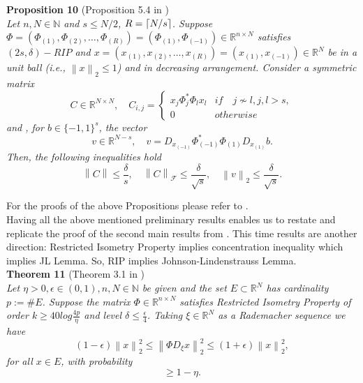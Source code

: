 \documentclass[twoside,11pt]{article}
\newcommand\norm[1]{\left\lVert#1\right\rVert}
\newcommand*\by{{\times}}
\DeclarePairedDelimiter\ceil{\lceil}{\rceil}
\begin{document}
\noindent
{\bf Proposition 10} (Proposition 5.4 in \citep{Khramer}) \\
{\it Let $n, N \in \mathbb{N}$ and $s \leq N/2$, $R = \ceil{N/s}$. Suppose $\Phi = (\Phi_{(1)}, \Phi_{(2)}, \dots, \Phi_{(R)}) = (\Phi_{(1)}, \Phi_{(-1)}) \in \mathbb{R}^{n \by N}$ satisfies $(2s, \delta)-RIP$ and $x = (x_{(1)}, x_{(2)}, \dots, x_{(R)}) = (x_{(1)}, x_{(-1)}) \in \mathbb{R}^N$ be in a unit ball (i.e., $\norm{x}_2 \leq 1$) and in decreasing arrangement. Consider a symmetric matrix
$$
 C \in \mathbb{R}^{N \by N}, \quad C_{i,j} =
 \begin{cases} 
 x_j \Phi_j^*\Phi_l x_l & if \quad j \not \sim l, j,l > s, \\
 0 & otherwise
 \end{cases}
$$
and , for $b \in \{-1, 1\}^s$, the vector
$$
v \in \mathbb{R}^{N-s}, \quad v = D_{x_{(-1)}} \Phi_{(-1)}^* \Phi_{(1)} D_{x_{(1)}} b.
$$
Then, the following inequalities hold
$$
\norm{C} \leq \frac{\delta}{s}, \quad \norm{C}_{\mathcal{F}} \leq \frac{\delta}{\sqrt{s}}, \quad \norm{v}_2 \leq \frac{\delta}{\sqrt{s}}.
$$
}

For the proofs of the above Propositions please refer to \citep{Khramer}. \\

Having all the above mentioned preliminary results enables us to restate and replicate the proof of the second main results from \citep{Khramer}. This time results are another direction: Restricted Isometry Property implies concentration inequality which implies JL Lemma. So, RIP implies Johnson-Lindenstrauss Lemma. \\

\noindent
{\bf Theorem 11} (Theorem 3.1 in \citep{Khramer}) \\
{\it
Let $\eta > 0, \epsilon \in (0, 1), n, N \in \mathbb{N}$ be given and the set $E \subset \mathbb{R}^N$ has cardinality $p := \#E$. Suppose the matrix $\Phi \in \mathbb{R}^{n \by N}$ satisfies Restricted Isometry Property of order $k \geq 40log\frac{4p}{\eta}$ and level $\delta \leq \frac{\epsilon}{4}$. Taking $\xi \in \mathbb{R}^N$ as a Rademacher sequence we have 
\begin{equation}
    \label{eqn:iso_jl1}
    (1 - \epsilon) \norm{x}_2^2 \leq \norm{\Phi D_{\xi}x}_2^2 \leq (1 + \epsilon) \norm{x}_2^2,
\end{equation}
for all $x \in E$, with probability
$$
 \geq 1- \eta.
$$
}
\end{document}
